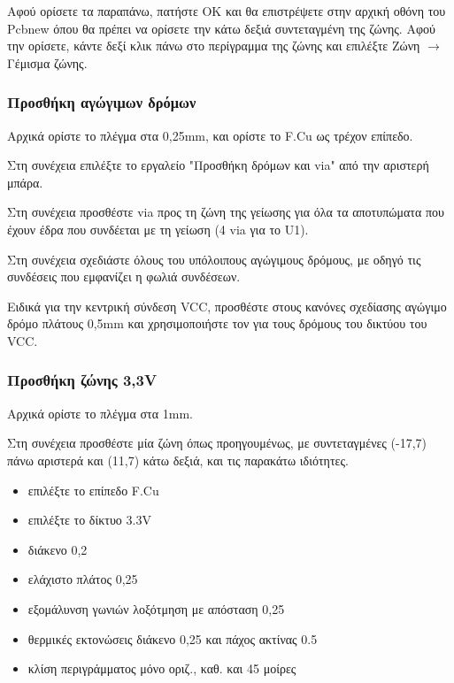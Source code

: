 \documentclass[a4paper]{article}
\begin{document}
Αφού ορίσετε τα παραπάνω, πατήστε ΟΚ και θα επιστρέψετε στην αρχική οθόνη του \textenglish{Pcbnew} όπου θα πρέπει να ορίσετε την κάτω δεξιά συντεταγμένη της ζώνης. Αφού την ορίσετε, κάντε δεξί κλικ πάνω στο περίγραμμα της ζώνης και επιλέξτε Ζώνη $\rightarrow$ Γέμισμα ζώνης.

\begin{figure}
  \begin{center}
    \label{fig:kicad-main}
  \end{center}
\end{figure}

\subsubsection{Προσθήκη αγώγιμων δρόμων}

Αρχικά ορίστε το πλέγμα στα 0,25mm, και ορίστε το F.Cu ως τρέχον επίπεδο.

Στη συνέχεια επιλέξτε το εργαλείο "Προσθήκη δρόμων και via" από την αριστερή μπάρα.

Στη συνέχεια προσθέστε via προς τη ζώνη της γείωσης για όλα τα αποτυπώματα που έχουν έδρα που συνδέεται με τη γείωση (4 via για το U1). 


Στη συνέχεια σχεδιάστε όλους του υπόλοιπους αγώγιμους δρόμους, με οδηγό τις συνδέσεις που εμφανίζει η φωλιά συνδέσεων.

Ειδικά για την κεντρική σύνδεση VCC, προσθέστε στους κανόνες σχεδίασης αγώγιμο δρόμο πλάτους 0,5mm και χρησιμοποιήστε τον για τους δρόμους του δικτύου του VCC.



\subsubsection{Προσθήκη ζώνης 3,3V}

Αρχικά ορίστε το πλέγμα στα 1mm.

Στη συνέχεια προσθέστε μία ζώνη όπως προηγουμένως, με συντεταγμένες (-17,7) πάνω αριστερά και (11,7) κάτω δεξιά, και τις παρακάτω ιδιότητες.

\begin{itemize}
    \item επιλέξτε το επίπεδο F.Cu
    \item επιλέξτε το δίκτυο 3.3V
    \item διάκενο 0,2
    \item ελάχιστο πλάτος 0,25
    \item εξομάλυνση γωνιών λοξότμηση με απόσταση 0,25
    \item θερμικές εκτονώσεις διάκενο 0,25 και πάχος ακτίνας 0.5
    \item κλίση περιγράμματος μόνο οριζ., καθ. και 45 μοίρες
\end{itemize}
\end{document}
